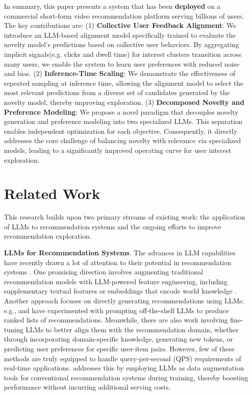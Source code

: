 \documentclass[11pt]{article}
\begin{document}
In summary, this paper presents a system that has been \textbf{deployed} on a commercial short-form video recommendation platform serving billions of users. The key contributions are: (1) \textbf{Collective User Feedback Alignment}: We introduce an LLM-based alignment model specifically trained to evaluate the novelty model's predictions based on collective user behaviors. By aggregating implicit signals(e.g. clicks and dwell time) for interest clusters transition across many users, we enable the system to learn user preferences with reduced noise and bias. (2) \textbf{Inference-Time Scaling}: We demonstrate the effectiveness of repeated sampling at inference time, allowing the alignment model to select the most relevant predictions from a diverse set of candidates generated by the novelty model, thereby improving exploration. (3) \textbf{Decomposed Novelty and Preference Modeling}: We propose a novel paradigm that decouples novelty generation and preference modeling into two specialized LLMs. This separation enables independent optimization for each objective. Consequently, it directly addresses the core challenge of balancing novelty with relevance via specialized models, leading to a significantly improved operating curve for user interest exploration. 

\section{Related Work}
This research builds upon two primary streams of existing work: the application of LLMs to recommendation systems and the ongoing efforts to improve recommendation exploration.

\smallskip
\noindent\textbf{LLMs for Recommendation Systems}. 
The advances in LLM capabilities have recently drawn a lot of attention to their potential in recommendation systems \cite{bao2023tallrec,geng2023vip5,hou2023large,li2023gpt4rec,liu2023chatgpt,wang2024fresh}. One promising direction involves augmenting traditional recommendation models with LLM-powered feature engineering, including supplementary textual features or embeddings that encode world knowledge \cite{xi2024towards,ren2024representation}. Another approach focuses on directly generating recommendations using LLMs; e.g., \citeauthor{hou2023large} and \citeauthor{gao2023chat} have experimented with prompting off-the-shelf LLMs to produce ranked lists of recommendations. Meanwhile, there are also work involving fine-tuning LLMs \cite{singh2024better,bao2023tallrec, lin2024rella} to better align them with the recommendation domain, whether through incorporating domain-specific knowledge, generating new tokens, or predicting user preferences for specific user-item pairs. However, few of these methods are truly equipped to handle query-per-second (QPS) requirements of real-time applications. \cite{wang2024large} addresses this by employing LLMs as data augmentation tools for conventional recommendation systems during training, thereby boosting performance without incurring additional serving costs. 
\end{document}

